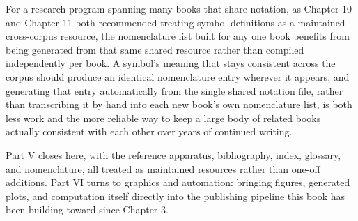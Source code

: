 For a research program spanning many books that share notation, as Chapter 10 and Chapter 11 both recommended treating symbol definitions as a maintained cross-corpus resource, the nomenclature list built for any one book benefits from being generated from that same shared resource rather than compiled independently per book. A symbol's meaning that stays consistent across the corpus should produce an identical nomenclature entry wherever it appears, and generating that entry automatically from the single shared notation file, rather than transcribing it by hand into each new book's own nomenclature list, is both less work and the more reliable way to keep a large body of related books actually consistent with each other over years of continued writing.

Part V closes here, with the reference apparatus, bibliography, index, glossary, and nomenclature, all treated as maintained resources rather than one-off additions. Part VI turns to graphics and automation: bringing figures, generated plots, and computation itself directly into the publishing pipeline this book has been building toward since Chapter 3.
